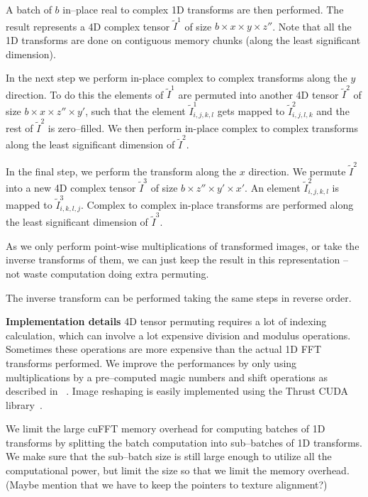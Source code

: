 \documentclass[conference]{IEEEtran}
\begin{document}
  A batch of $b$ in--place real to complex 1D transforms are then
  performed.  The result represents a 4D complex tensor
  $\widetilde{I}^1$ of size $b \times x \times y \times z''$.  Note
  that all the 1D transforms are done on contiguous memory chunks
  (along the least significant dimension).

  In the next step we perform in-place complex to complex transforms
  along the $y$ direction.  To do this the elements of
  $\widetilde{I}^1$ are permuted into another 4D tensor
  $\widetilde{I}^2$ of size $b \times x \times z'' \times y'$, such
  that the element $\widetilde{I}^1_{i,j,k,l}$ gets mapped to
  $\widetilde{I}^2_{i,j,l,k}$ and the rest of $\widetilde{I}^2$ is
  zero--filled.  We then perform in-place complex to complex
  transforms along the least significant dimension of
  $\widetilde{I}^2$.

  In the final step, we perform the transform along the $x$ direction.
  We permute $\widetilde{I}^2$ into a new 4D complex tensor
  $\widetilde{I}^3$ of size $b \times z'' \times y' \times x'$.  An
  element $\widetilde{I}^2_{i,j,k,l}$ is mapped to
  $\widetilde{I}^3_{i,k,l,j}$.  Complex to complex in-place transforms
  are performed along the least significant dimension of
  $\widetilde{I}^3$.

  As we only perform point-wise multiplications of transformed images,
  or take the inverse transforms of them, we can just keep the result
  in this representation -- not waste computation doing extra
  permuting.

  The inverse transform can be performed taking the same steps in
  reverse order.

  {\bf Implementation details} 4D tensor permuting requires a lot of
  indexing calculation, which can involve a lot expensive division and
  modulus operations.  Sometimes these operations are more expensive
  than the actual 1D FFT transforms performed.  We improve the
  performances by only using multiplications by a pre--computed magic
  numbers and shift operations as described in
  ~\cite{warren2013hacker}.  Image reshaping is easily implemented
  using the Thrust CUDA library~\cite{bell2011thrust}.

  We limit the large cuFFT memory overhead for computing batches of 1D
  transforms by splitting the batch computation into sub--batches of
  1D transforms.  We make sure that the sub--batch size is still large
  enough to utilize all the computational power, but limit the size so
  that we limit the memory overhead.  (Maybe mention that we have to
  keep the pointers to texture alignment?)
\end{document}
